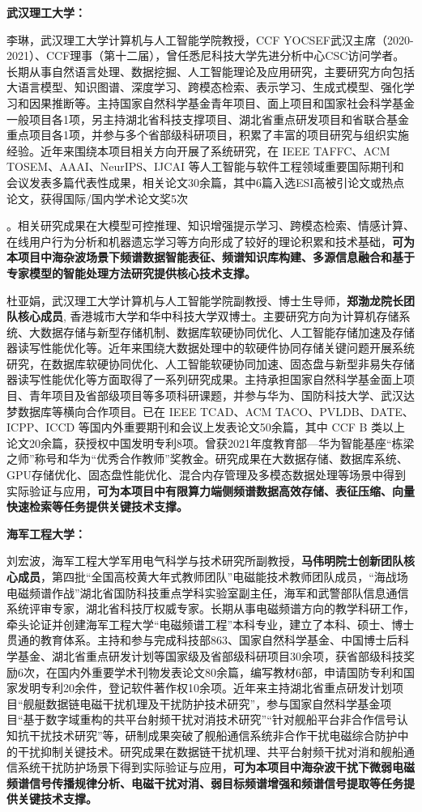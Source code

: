 {\textbf{武汉理工大学：}

李琳，武汉理工大学计算机与人工智能学院教授，CCF YOCSEF武汉主席（2020-2021）、CCF理事（第十二届），曾任悉尼科技大学先进分析中心CSC访问学者。长期从事自然语言处理、数据挖掘、人工智能理论及应用研究，主要研究方向包括大语言模型、知识图谱、深度学习、跨模态检索、表示学习、生成式模型、强化学习和因果推断等。主持国家自然科学基金青年项目、面上项目和国家社会科学基金一般项目各1项，另主持湖北省科技支撑项目、湖北省重点研发项目和省联合基金重点项目各1项，并参与多个省部级科研项目，积累了丰富的项目研究与组织实施经验。近年来围绕本项目相关方向开展了系统研究，在 IEEE TAFFC、ACM TOSEM、AAAI、NeurIPS、IJCAI 等人工智能与软件工程领域重要国际期刊和会议发表多篇代表性成果，相关论文30余篇，其中6篇入选ESI高被引论文或热点论文，获得国际/国内学术论文奖5次}。相关研究成果在大模型可控推理、知识增强提示学习、跨模态检索、情感计算、在线用户行为分析和机器遗忘学习等方向形成了较好的理论积累和技术基础，\textbf{可为本项目中海杂波场景下频谱数据智能表征、频谱知识库构建、多源信息融合和基于专家模型的智能处理方法研究提供核心技术支撑。}

杜亚娟，武汉理工大学计算机与人工智能学院副教授、博士生导师，\textbf{郑渤龙院长团队核心成员}, 香港城市大学和华中科技大学双博士。主要研究方向为计算机存储系统、大数据存储与新型存储机制、数据库软硬协同优化、人工智能存储加速及存储器读写性能优化等。近年来围绕大数据处理中的软硬件协同存储关键问题开展系统研究，在数据库软硬协同优化、人工智能软硬协同加速、固态盘与新型非易失存储器读写性能优化等方面取得了一系列研究成果。主持承担国家自然科学基金面上项目、青年项目及省部级项目等多项科研课题，并参与华为、国防科技大学、武汉达梦数据库等横向合作项目。已在 IEEE TCAD、ACM TACO、PVLDB、DATE、ICPP、ICCD 等国内外重要期刊和会议上发表论文50余篇，其中 CCF B 类以上论文20余篇，获授权中国发明专利8项。曾获2021年度教育部—华为智能基座“栋梁之师”称号和华为“优秀合作教师”奖教金。研究成果在大数据存储、数据库系统、GPU存储优化、固态盘性能优化、混合内存管理及多模态数据处理等场景中得到实际验证与应用，\textbf{可为本项目中有限算力端侧频谱数据高效存储、表征压缩、向量快速检索等任务提供关键技术支撑。}

\textbf{海军工程大学：}

刘宏波，海军工程大学军用电气科学与技术研究所副教授，\textbf{马伟明院士创新团队核心成员}，第四批“全国高校黄大年式教师团队”电磁能技术教师团队成员，“海战场电磁频谱作战”湖北省国防科技重点学科实验室副主任，海军和武警部队信息通信系统评审专家，湖北省科技厅权威专家。长期从事电磁频谱方向的教学科研工作，牵头论证并创建海军工程大学“电磁频谱工程”本科专业，建立了本科、硕士、博士贯通的教育体系。主持和参与完成科技部863、国家自然科学基金、中国博士后科学基金、湖北省重点研发计划等国家级及省部级科研项目30余项，获省部级科技奖励6次，在国内外重要学术刊物发表论文80余篇，编写教材6部，申请国防专利和国家发明专利20余件，登记软件著作权10余项。近年来主持湖北省重点研发计划项目“舰艇数据链电磁干扰机理及干扰防护技术研究”，参与国家自然科学基金项目“基于数字域重构的共平台射频干扰对消技术研究”“针对舰船平台非合作信号认知抗干扰技术研究”等，研制成果突破了舰船通信系统非合作干扰电磁综合防护中的干扰抑制关键技术。研究成果在数据链干扰机理、共平台射频干扰对消和舰船通信系统干扰防护场景下得到实际验证与应用，\textbf{可为本项目中海杂波干扰下微弱电磁频谱信号传播规律分析、电磁干扰对消、弱目标频谱增强和频谱信号提取等任务提供关键技术支撑。}

